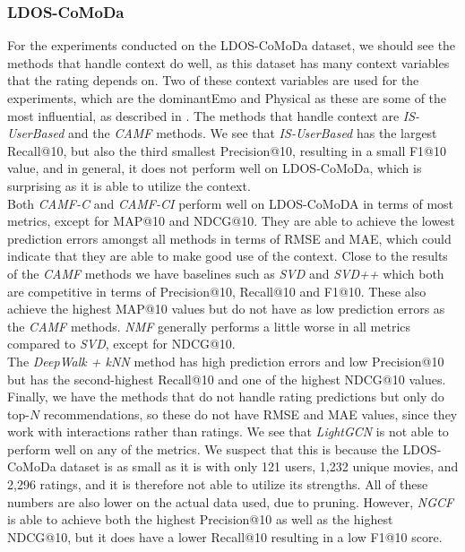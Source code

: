 \subsubsection{LDOS-CoMoDa}
For the experiments conducted on the LDOS-CoMoDa dataset, we should see the methods that handle context do well, as this dataset has many context variables that the rating depends on.
Two of these context variables are used for the experiments, which are the dominantEmo and Physical as these are some of the most influential, as described in .
The methods that handle context are \textit{IS-UserBased} and the \textit{CAMF} methods.
We see that \textit{IS-UserBased} has the largest Recall@10, but also the third smallest Precision@10, resulting in a small F1@10 value, and in general, it does not perform well on LDOS-CoMoDa, which is surprising as it is able to utilize the context.
\\
Both \textit{CAMF-C} and \textit{CAMF-CI} perform well on LDOS-CoMoDA in terms of most metrics, except for MAP@10 and NDCG@10.
They are able to achieve the lowest prediction errors amongst all methods in terms of RMSE and MAE, which could indicate that they are able to make good use of the context.
Close to the results of the \textit{CAMF} methods we have baselines such as \textit{SVD} and \textit{SVD++} which both are competitive in terms of Precision@10, Recall@10 and F1@10. 
These also achieve the highest MAP@10 values but do not have as low prediction errors as the \textit{CAMF} methods.
\textit{NMF} generally performs a little worse in all metrics compared to \textit{SVD}, except for NDCG@10.
\\
The \textit{DeepWalk + kNN} method has high prediction errors and low Precision@10 but has the second-highest Recall@10 and one of the highest NDCG@10 values.
Finally, we have the methods that do not handle rating predictions but only do top-$N$ recommendations, so these do not have RMSE and MAE values, since they work with interactions rather than ratings.
We see that \textit{LightGCN} is not able to perform well on any of the metrics.
We suspect that this is because the LDOS-CoMoDa dataset is as small as it is with only 121 users, 1,232 unique movies, and 2,296 ratings, and it is therefore not able to utilize its strengths.
All of these numbers are also lower on the actual data used, due to pruning.
However, \textit{NGCF} is able to achieve both the highest Precision@10 as well as the highest NDCG@10, but it does have a lower Recall@10 resulting in a low F1@10 score.
\\\\
